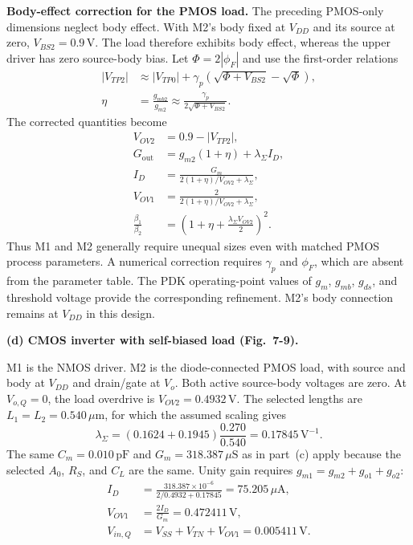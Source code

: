 \documentclass[12pt,letterpaper]{article}
\newcommand{\um}{\,\mu\mathrm{m}}
\newcommand{\uA}{\,\mu\mathrm{A}}
\newcommand{\uS}{\,\mu\mathrm{S}}
\newcommand{\V}{\,\mathrm{V}}
\newcommand{\pF}{\,\mathrm{pF}}
\begin{document}
\begin{enumerate}
\newpage
\textbf{Body-effect correction for the PMOS load.}
The preceding PMOS-only dimensions neglect body effect.
With M2's body fixed at $V_{DD}$ and its source at zero,
$V_{BS2}=0.9\V$. The load therefore exhibits body effect,
whereas the upper driver has zero source-body bias.
Let $\Phi=2|\phi_F|$ and use the first-order relations
\begin{align*}
|V_{TP2}|&\approx |V_{TP0}|
+\gamma_p\left(\sqrt{\Phi+V_{BS2}}-\sqrt{\Phi}\right),\\
\eta&=\frac{g_{mb2}}{g_{m2}}
\approx\frac{\gamma_p}{2\sqrt{\Phi+V_{BS2}}}.
\end{align*}
The corrected quantities become
\begin{align*}
V_{OV2}&=0.9-|V_{TP2}|,\\
G_{\mathrm{out}}&=g_{m2}(1+\eta)+\lambda_\Sigma I_D,\\
I_D&=\frac{G_m}{2(1+\eta)/V_{OV2}+\lambda_\Sigma},\\
V_{OV1}&=\frac{2}{2(1+\eta)/V_{OV2}+\lambda_\Sigma},\\
\frac{\beta_1}{\beta_2}
&=\left(1+\eta+\frac{\lambda_\Sigma V_{OV2}}{2}\right)^2.
\end{align*}
Thus M1 and M2 generally require unequal sizes even with matched
PMOS process parameters. A numerical correction requires
$\gamma_p$ and $\phi_F$, which are absent from the parameter table.
The PDK operating-point values of $g_m$, $g_{mb}$, $g_{ds}$,
and threshold voltage provide the corresponding refinement.
M2's body connection remains at $V_{DD}$ in this design.

\vspace{10pt}
\textbf{(d) CMOS inverter with self-biased load (Fig.~7-9).}

M1 is the NMOS driver. M2 is the diode-connected PMOS load,
with source and body at $V_{DD}$ and drain/gate at $V_o$.
Both active source-body voltages are zero.
At $V_{o,Q}=0$, the load overdrive is $V_{OV2}=0.4932\V$.
The selected lengths are $L_1=L_2=0.540\um$, for which the assumed scaling gives
\[
\lambda_\Sigma=(0.1624+0.1945)\frac{0.270}{0.540}
=0.17845\V^{-1}.
\]
The same $C_m=0.010\pF$ and
$G_m=318.387\uS$ as in part~(c) apply because the selected
$A_0$, $R_S$, and $C_L$ are the same.
Unity gain requires $g_{m1}=g_{m2}+g_{o1}+g_{o2}$:
\begin{align*}
I_D&=\frac{318.387\times10^{-6}}{2/0.4932+0.17845}
=75.205\uA,\\
V_{OV1}&=\frac{2I_D}{G_m}=0.472411\V,\\
V_{in,Q}&=V_{SS}+V_{TN}+V_{OV1}=0.005411\V.
\end{align*}


\end{enumerate}
\end{document}
